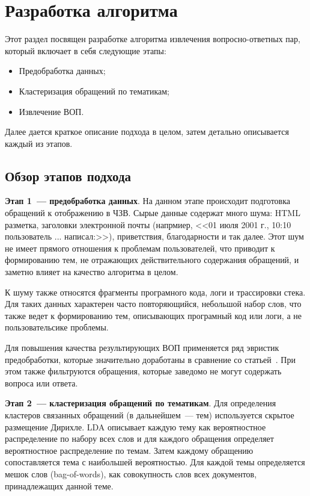 \chapter{Разработка алгоритма}
\label{chap:dev}

Этот раздел посвящен разработке алгоритма извлечения вопросно-ответных пар, который включает в себя следующие этапы:

\begin{itemize}
\item Предобработка данных;
\item Кластеризация обращений по тематикам;
\item Извлечение ВОП.
\end{itemize}

Далее дается краткое описание подхода в целом, затем детально описывается каждый из этапов.

\section{Обзор этапов подхода}
\label{sec:overview}

\textbf{Этап 1~--- предобработка данных}. На данном этапе происходит подготовка обращений к отображению в ЧЗВ. Сырые данные содержат много шума: HTML разметка, заголовки электронной почты (напрмиер, <<01 июля 2001 г., 10:10 пользователь ... написал:>>), приветствия, благодарности и так далее. Этот шум не имеет прямого отношения к проблемам пользователей, что приводит к формированию тем, не отражающих действительного содержания обращений, и заметно влияет на качество алгоритма в целом. 

К шуму также относятся фрагменты програмного кода, логи и трассировки стека. Для таких данных характерен часто повторяющийся, небольшой набор слов, что также ведет к формированию тем, описывающих програмный код или логи, а не пользовательсике проблемы.

Для повышения качества результирующих ВОП применяется ряд эвристик предобработки, которые значительно доработаны в сравнение со статьей~\cite{original}. При этом также фильтруются обращения, которые заведомо не могут содержать вопроса или ответа. 

\textbf{Этап 2~--- кластеризация обращений по тематикам}. Для определения кластеров связанных обращений (в дальнейшем~--- тем) используется скрытое размещение Дирихле. LDA описывает каждую тему как вероятностное распределение по набору всех слов и для каждого обращения определяет вероятностное распределение по темам. Затем каждому обращению сопоставляется тема с наибольшей вероятностью. Для каждой темы определяется мешок слов (bag-of-words), как совокупность слов всех документов, принадлежащих данной теме. 


